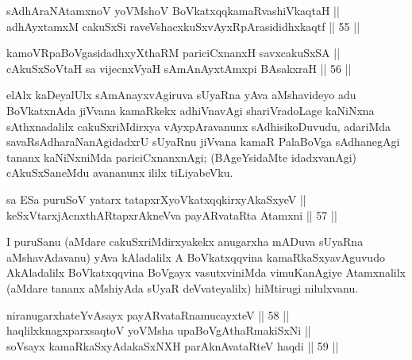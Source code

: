 
\begin{shl}
sAdhAraNAtamxnoV yoVM\s shoV BoVkatxqqkamaRvashiVkaqtaH || \\
adhAyxtamxM cakuSxSi raveVshacxkuSxvAyxRpArasididhxkaqtf \hfill || 55 ||  
\end{shl}

\begin{shl}
kamoVRpaBoVgasidadhxyXthaRM pariciCxnanxH savxcakuSxSA || \\
\footnotemark[1]cAkuSxSoV\s taH sa vijecnxVyaH sAmAnAyxtAmx\s pi BAsakxraH \hfill || 56 ||  
\end{shl}

\begin{artha}
elAlx kaDeyalUlx sAmAnayxvAgiruva sUyaRna yAva aMshavideyo
adu BoVkatxnAda jiVvana kamaRkekx adhiVnavAgi shariVradoLage kaNiNxna
sAthxnadalilx cakuSxriMdirxya vAyxpAravanunx sAdhisikoDuvudu, adariMda
savaRsAdharaNanAgidadxrU sUyaRnu jiVvana kamaR PalaBoVga sAdhanegAgi
tananx kaNiNxniMda pariciCxnanxnAgi; (BAgeYsidaMte idadxvanAgi)
cAkuSxSaneMdu avananunx ililx tiLiyabeVku.
\end{artha}


\begin{shl}
sa ESa puruSoV yatarx tatapxrXyoVkatxqqkirxyAkaSxyeV || \\
keSxVtarxjAcnxthARtapxrAkneVva payARvataRta Atamxni \hfill || 57 ||  
\end{shl}

\begin{artha}
I puruSanu (aMdare cakuSxriMdirxyakekx anugarxha mADuva sUyaRna aMshavAdavanu)
yAva kAladalilx A BoVkatxqqvina kamaRkaSxyavAguvudo
AkAladalilx BoVkatxqqvina BoVgayx vasutxviniMda vimuKanAgiye
Atamxnalilx (aMdare tananx aMshiyAda sUyaR deVvateyalilx) hiMtirugi
nilulxvanu.
\end{artha}


\begin{shl}
niranugarxhateYvAsayx payARvataRnamucayxteV \hfill || 58 ||  \\
haqlilxknagxparxsaqtoV yoVM\s sha upaBoVgAthaRmakiSxNi || \\
soV\s sayx kamaRkaSxyAdakaSxNXH parAknAvataRteV haqdi \hfill || 59 ||  
\end{shl}

